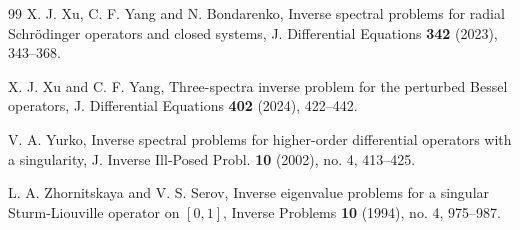 \documentclass[reqno,12pt,centertags]{amsart}
\numberwithin{equation}{section}
\theoremstyle{definition}
\begin{document}
\begin{thebibliography}{99}
X. J. Xu, C. F. Yang and N. Bondarenko, 
Inverse spectral problems for radial Schr\"{o}dinger operators and closed systems,
J. Differential Equations \textbf{342} (2023), 343--368.


X. J. Xu and C. F. Yang, 
Three-spectra inverse problem for the perturbed Bessel operators, 
J. Differential Equations \textbf{402} (2024), 422--442.


V. A. Yurko,
Inverse spectral problems for higher-order differential operators with a singularity,
J. Inverse Ill-Posed Probl. \textbf{10} (2002), no. 4, 413--425.

L. A. Zhornitskaya and V. S. Serov, 
Inverse eigenvalue problems for a singular Sturm-Liouville operator on $[0,1]$,
Inverse Problems \textbf{10} (1994), no. 4, 975--987.


\end{thebibliography}
\end{document}
